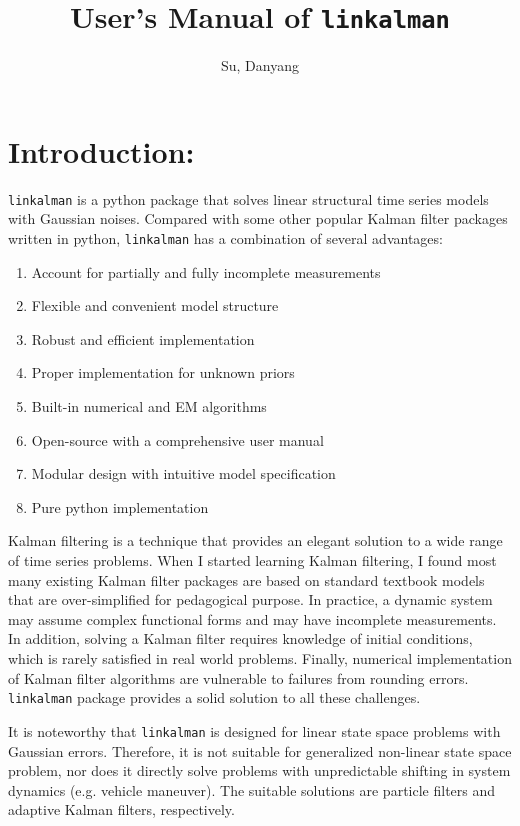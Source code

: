 \documentclass[10pt, titlepage]{article}
\title{User's Manual of \texttt{linkalman}}
\author{Su, Danyang}
\newenvironment{boenumerate}
    {\begin{enumerate}\renewcommand\labelenumi{\textbf\theenumi}}
    {\end{enumerate}}
\numberwithin{equation}{section}
\begin{document}
\maketitle
\thispagestyle{empty}
\clearpage
{}
\tableofcontents
\newpage
\section{Introduction:}
\texttt{linkalman} is a python package that solves linear structural time series models with Gaussian noises. Compared with some other popular Kalman filter packages written in python, \texttt{linkalman} has a combination of several advantages:
\begin{boenumerate}
    \item Account for partially and fully incomplete measurements 
    \item Flexible and convenient model structure
    \item Robust and efficient implementation
    \item Proper implementation for unknown priors
    \item Built-in numerical and EM algorithms
    \item Open-source with a comprehensive user manual 
    \item Modular design with intuitive model specification
    \item Pure python implementation 
\end{boenumerate}
Kalman filtering is a technique that provides an elegant solution to a wide range of time series problems. When I started learning Kalman filtering, I found most many existing Kalman filter packages are based on standard textbook models that are over-simplified for pedagogical purpose. In practice, a dynamic system may assume complex functional forms and may have incomplete measurements. In addition, solving a Kalman filter requires knowledge of initial conditions, which is rarely satisfied in real world problems. Finally, numerical implementation of Kalman filter algorithms are vulnerable to failures from rounding errors. \texttt{linkalman} package provides a solid solution to all these challenges. 

It is noteworthy that \texttt{linkalman} is designed for linear state space problems with Gaussian errors. Therefore, it is not suitable for generalized non-linear state space problem, nor does it directly solve problems with unpredictable shifting in system dynamics (e.g. vehicle maneuver). The suitable solutions are particle filters and adaptive Kalman filters, respectively.
\end{document}
